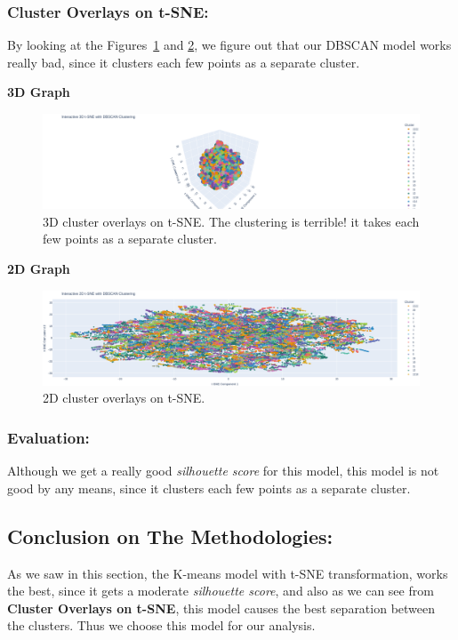 \documentclass[a4paper,12pt]{article}
\begin{document}
\subsubsection{Cluster Overlays on t-SNE:}
By looking at the Figures~\ref{fig:fig_8} and \ref{fig:fig_9}, we figure out that our DBSCAN model works really bad, since it clusters each few points as a separate cluster.

\noindent\textbf{3D Graph}
\begin{figure}[H]
    \centering
    \includegraphics[width=1\textwidth]{./images/3d_tsne_dbscan.png}
    \caption{3D cluster overlays on t-SNE. The clustering is terrible! it takes each few points as a separate cluster.}
    \label{fig:fig_8}
\end{figure}

\noindent\textbf{2D Graph}
\begin{figure}[H]
    \centering
    \includegraphics[width=1\textwidth]{./images/2d_tsne_dbscan.png}
    \caption{2D cluster overlays on t-SNE.}
    \label{fig:fig_9}
\end{figure}

\subsubsection{Evaluation:}
Although we get a really good \textit{silhouette score} for this model, this model is not good by any means, since it clusters each few points as a separate cluster.

\subsection{Conclusion on The Methodologies:}
As we saw in this section, the K-means model with t-SNE transformation, works the best, since it gets a moderate \textit{silhouette score}, and also as we can see from \textbf{Cluster Overlays on t-SNE}, this model causes the best separation between the clusters. Thus we choose this model for our analysis.
\end{document}
